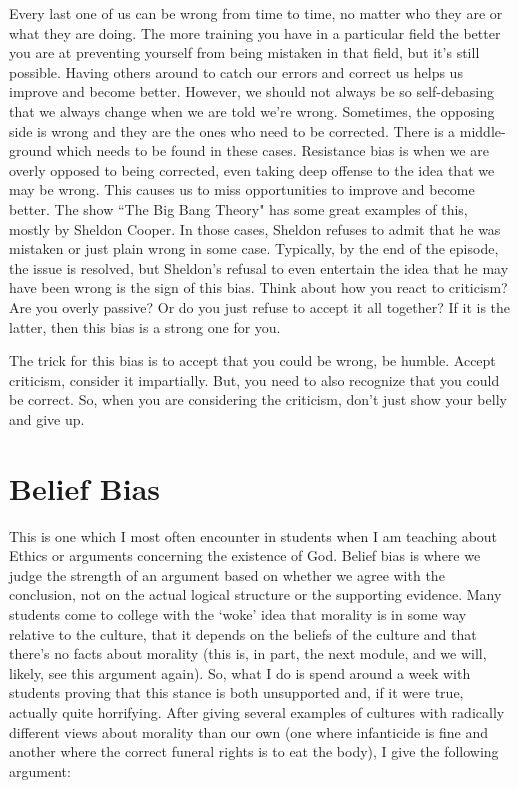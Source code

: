 Every last one of us can be wrong from time to time, no matter who they are or what they are doing. The more training you have in a particular field the better you are at preventing yourself from being mistaken in that field, but it's still possible. Having others around to catch our errors and correct us helps us improve and become better. However, we should not always be so self-debasing that we always change when we are told we're wrong. Sometimes, the opposing side is wrong and they are the ones who need to be corrected. There is a middle-ground which needs to be found in these cases. Resistance bias is when we are overly opposed to being corrected, even taking deep offense to the idea that we may be wrong. This causes us to miss opportunities to improve and become better. The show ``The Big Bang Theory" has some great examples of this, mostly by Sheldon Cooper. In those cases, Sheldon refuses to admit that he was mistaken or just plain wrong in some case. Typically, by the end of the episode, the issue is resolved, but Sheldon's refusal to even entertain the idea that he may have been wrong is the sign of this bias. Think about how you react to criticism? Are you overly passive? Or do you just refuse to accept it all together? If it is the latter, then this bias is a strong one for you. 

The trick for this bias is to accept that you could be wrong, be humble. Accept criticism, consider it impartially. But, you need to also recognize that you could be correct. So, when you are considering the criticism, don't just show your belly and give up.

\section{Belief Bias}

This is one which I most often encounter in students when I am teaching about Ethics or arguments concerning the existence of God. Belief bias is where we judge the strength of an argument based on whether we agree with the conclusion, not on the actual logical structure or the supporting evidence. Many students come to college with the `woke' idea that morality is in some way relative to the culture, that it depends on the beliefs of the culture and that there's no facts about morality (this is, in part, the next module, and we will, likely, see this argument again). So, what I do is spend around a week with students proving that this stance is both unsupported and, if it were true, actually quite horrifying. After giving several examples of cultures with radically different views about morality than our own (one where infanticide is fine and another where the correct funeral rights is to eat the body), I give the following argument:

